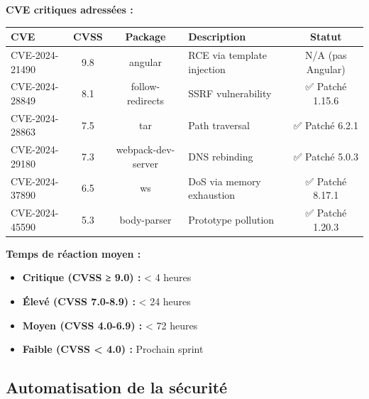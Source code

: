 \begin{tcolorbox}[colback=red!5!white,colframe=red!60!black,title=\textbf{CVE suivies et traitées en 2024}]
\textbf{CVE critiques adressées :}
\begin{center}
\begin{tabular}{|p{3cm}|c|c|p{5cm}|c|}
\hline
\textbf{CVE} & \textbf{CVSS} & \textbf{Package} & \textbf{Description} & \textbf{Statut} \\
\hline
CVE-2024-21490 & 9.8 & angular & RCE via template injection & N/A (pas Angular) \\
\hline
CVE-2024-28849 & 8.1 & follow-redirects & SSRF vulnerability & ✅ Patché 1.15.6 \\
\hline
CVE-2024-28863 & 7.5 & tar & Path traversal & ✅ Patché 6.2.1 \\
\hline
CVE-2024-29180 & 7.3 & webpack-dev-server & DNS rebinding & ✅ Patché 5.0.3 \\
\hline
CVE-2024-37890 & 6.5 & ws & DoS via memory exhaustion & ✅ Patché 8.17.1 \\
\hline
CVE-2024-45590 & 5.3 & body-parser & Prototype pollution & ✅ Patché 1.20.3 \\
\hline
\end{tabular}
\end{center}

\textbf{Temps de réaction moyen :}
\begin{itemize}
    \item \textbf{Critique (CVSS ≥ 9.0) :} < 4 heures
    \item \textbf{Élevé (CVSS 7.0-8.9) :} < 24 heures
    \item \textbf{Moyen (CVSS 4.0-6.9) :} < 72 heures
    \item \textbf{Faible (CVSS < 4.0) :} Prochain sprint
\end{itemize}
\end{tcolorbox}

\subsection{Automatisation de la sécurité}

